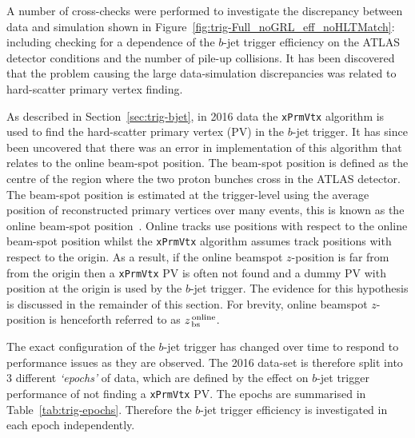 \newpage

A number of cross-checks were performed to investigate the discrepancy between data and simulation shown in Figure~\ref{fig:trig-Full_noGRL_eff_noHLTMatch}:
including checking for a dependence of the $b$-jet trigger efficiency on the ATLAS detector conditions and the number of pile-up collisions.
It has been discovered that the problem causing the large data-simulation discrepancies was related to hard-scatter primary vertex finding.

As described in Section~\ref{sec:trig-bjet}, in 2016 data the \verb|xPrmVtx| algorithm is used to find the hard-scatter primary vertex (PV) in the $b$-jet trigger.
It has since been uncovered that there was an error in implementation of this algorithm that relates to the online beam-spot position.
The beam-spot position is defined as the centre of the region where the two proton bunches cross in the ATLAS detector.
The beam-spot position is estimated at the trigger-level using the average position of reconstructed primary vertices over many events,
this is known as the online beam-spot position~\cite{trig-onlinePV}.
Online tracks use positions with respect to the online beam-spot position
whilst the \verb|xPrmVtx| algorithm assumes track positions with respect to the origin.
As a result, if the online beamspot $z$-position is far from from the origin then
a \verb|xPrmVtx| PV is often not found and a dummy PV with position at the origin is used by the $b$-jet trigger.
The evidence for this hypothesis is discussed in the remainder of this section.
For brevity, online beamspot $z$-position is henceforth referred to as $z_{\,\text{bs}}^{\text{\,online}}$.  

The exact configuration of the $b$-jet trigger has changed over time to respond to performance issues as they are observed.
The 2016 data-set is therefore split into 3 different \textit{`epochs'} of data, which are defined by the effect on $b$-jet trigger performance of not finding a \verb|xPrmVtx| PV.
The epochs are summarised in Table~\ref{tab:trig-epochs}.
Therefore the $b$-jet trigger efficiency is investigated in each epoch independently.


